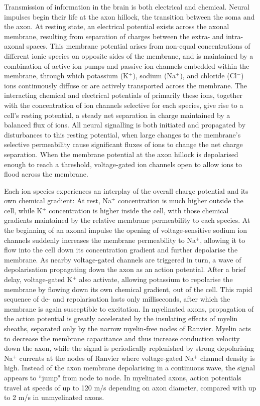 Transmission of information in the brain is both electrical and chemical.
Neural impulses begin their life at the axon hillock, the transition between the soma and the axon.
At resting state, an electrical potential exists across the axonal membrane, resulting from separation of charges between the extra- and intra-axonal spaces.
This membrane potential arises from non-equal concentrations of different ionic species on opposite sides of the membrane, and is maintained by a combination of active ion pumps and passive ion channels embedded within the membrane, through which potassium (K$^+$), sodium (Na$^+$), and chloride (Cl$^-$) ions continuously diffuse or are actively transported across the membrane.
The interacting chemical and electrical potentials of primarily these ions, together with the concentration of ion channels selective for each species, give rise to a cell's resting potential, a steady net separation in charge maintained by a balanced flux of ions.
All neural signalling is both initiated and propagated by disturbances to this resting potential, when large changes to the membrane's selective permeability cause significant fluxes of ions to change the net charge separation.
When the membrane potential at the axon hillock is depolarised enough to reach a threshold, voltage-gated ion channels open to allow ions to flood across the membrane.

Each ion species experiences an interplay of the overall charge potential and its own chemical gradient:
At rest, Na$^+$ concentration is much higher outside the cell, while K$^+$ concentration is higher inside the cell, with those chemical gradients maintained by the relative membrane permeability to each species.
At the beginning of an axonal impulse the opening of voltage-sensitive sodium ion channels suddenly increases the membrane permeability to Na$^+$, allowing it to flow into the cell down its concentration gradient and further depolarise the membrane.
As nearby voltage-gated channels are triggered in turn, a wave of depolarisation propagating down the axon as an action potential.
After a brief delay, voltage-gated K$^+$ also activate, allowing potassium to repolarise the membrane by flowing down its own chemical gradient, out of the cell.
This rapid sequence of de- and repolarisation lasts only milliseconds, after which the membrane is again susceptible to excitation.
In myelinated axons, propagation of the action potential is greatly accelerated by the insulating effects of myelin sheaths, separated only by the narrow myelin-free nodes of Ranvier.
Myelin acts to decrease the membrane capacitance and thus increase conduction velocity down the axon, while the signal is periodically replenished by strong depolarising Na$^+$ currents at the nodes of Ranvier where voltage-gated Na$^+$ channel density is high.
Instead of the axon membrane depolarising in a continuous wave, the signal appears to ``jump" from node to node.
In myelinated axons, action potentials travel at speeds of up to 120 m/s depending on axon diameter, compared with up to 2 m/s in unmyelinated axons.

